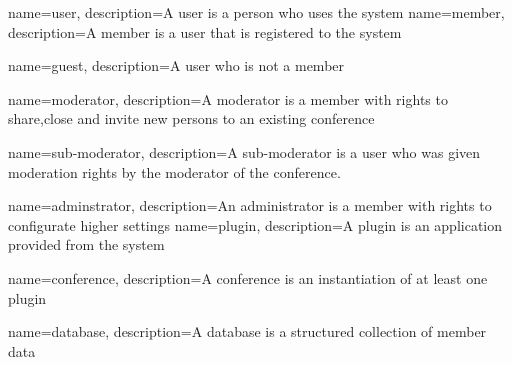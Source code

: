 {
  name=user,
  description={A user is a person who uses the system}
}
{
  name=member,
  description={A member is a user that is registered to the system}
}

{
  name=guest,
  description={A user who is not a member}
}

{
  name=moderator,
  description={A moderator is a member with rights to share,close and invite new persons to an existing conference}
}

{
  name=sub-moderator,
  description={A sub-moderator is a user who was given moderation rights by the moderator of the conference.}
}

{
  name=adminstrator,
  description={An administrator is a member with rights to configurate higher settings}
}
{
  name=plugin,
  description={A plugin is an application provided from the system}
}

{
  name=conference,
  description={A conference is an instantiation of at least one plugin}
}

{
  name=database,
  description={A database is a structured collection of member data}
}
